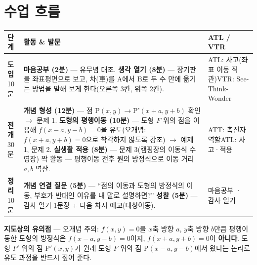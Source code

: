 \documentclass[11pt,a4paper]{article}
\begin{document}
\section{수업 흐름}
\begin{tabularx}{\linewidth}{@{}>{\centering\arraybackslash}p{1.6cm}X>{\raggedright\arraybackslash\small}p{3.1cm}@{}}
\toprule
\textbf{단계} & \textbf{활동 \& 발문} & \textbf{ATL / VTR} \\
\midrule
\textcolor{goldstrong}{\textbf{도입}}\newline\footnotesize 10분 &
\textbf{마음공부 (2분)} --- 유무념 대조.\newline
\textbf{생각 열기 (8분)} --- 장기판을 좌표평면으로 보고, 차(車)를 A에서 B로 두 수 만에 옮기는 방법을 말해 보게 한다(오른쪽 3칸, 위쪽 2칸). &
ATL: 사고(좌표 이동 직관)\newline VTR: See-Think-Wonder \\
\addlinespace
\textcolor{goldstrong}{\textbf{전개}}\newline\footnotesize 30분 &
\textbf{개념 형성 (12분)} --- 점 P$(x,y)\to$P'$(x+a,y+b)$ 확인 $\to$ 문제 1.\newline
\textbf{도형의 평행이동 (10분)} --- 도형 $F$ 위의 점을 이용해 $f(x-a,y-b)=0$을 유도(오개념: $f(x+a,y+b)=0$으로 착각하지 않도록 강조) $\to$ 예제 1, 문제 2.\newline
\textbf{실생활 적용 (8분)} --- 문제 3(캠핑장의 이동식 수영장) 짝 활동 --- 평행이동 전후 원의 방정식으로 이동 거리 $a,b$ 역산. &
ATT: 촉진자 역할\newline ATL: 사고·적용 \\
\addlinespace
\textcolor{goldstrong}{\textbf{정리}}\newline\footnotesize 10분 &
\textbf{개념 연결 질문 (5분)} --- ``점의 이동과 도형의 방정식의 이동, 부호가 반대인 이유를 내 말로 설명하면?''\newline
\textbf{성찰 (5분)} --- 감사 일기 1문장 + 다음 차시 예고(대칭이동). &
마음공부 · 감사 일기 \\
\bottomrule
\end{tabularx}

\begin{calloutbox}
\textbf{지도상의 유의점} --- 오개념 주의: $f(x,y)=0$을 $x$축 방향 $a$, $y$축 방향 $b$만큼 평행이동한 도형의 방정식은 $f(x-a,y-b)=0$이지, $f(x+a,y+b)=0$이 \textbf{아니다}. 도형 $F'$ 위의 점 P$'(x,y)$가 원래 도형 $F$ 위의 점 P$(x-a,y-b)$에서 왔다는 논리로 유도 과정을 반드시 짚어 준다.
\end{calloutbox}
\end{document}
